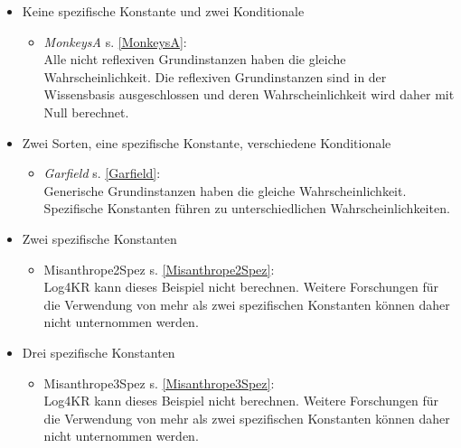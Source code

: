 \documentclass[a4paper, 11pt]{book}
\begin{document}
\begin{itemize}
\begin{itemize}
\end{itemize}

\item{Keine spezifische Konstante und zwei Konditionale}
\begin{itemize}
	\item \textsl{MonkeysA} \label{BMonkeysA} s. \ref{MonkeysA}:\\
	Alle nicht reflexiven Grundinstanzen haben die gleiche Wahrscheinlichkeit. Die reflexiven Grundinstanzen sind in der Wissensbasis ausgeschlossen und deren Wahrscheinlichkeit wird daher mit Null berechnet.

\end{itemize}
	
\item{Zwei Sorten, eine spezifische Konstante, verschiedene Konditionale}
\begin{itemize}
	\item \textsl{Garfield} \label{BGarfield} s. \ref{Garfield}:\\
	Generische Grundinstanzen haben die gleiche Wahrscheinlichkeit. Spezifische Konstanten führen zu unterschiedlichen Wahrscheinlichkeiten.
\end{itemize}

\item Zwei spezifische Konstanten 
\begin{itemize}
 \item{Misanthrope2Spez}	\label{BMisanthrope2Spez} s. \ref{Misanthrope2Spez}:\\
Log4KR kann dieses Beispiel nicht berechnen. Weitere Forschungen für die Verwendung von mehr als zwei spezifischen Konstanten können daher nicht unternommen werden.
\end{itemize}


	\item Drei spezifische Konstanten 
	\begin{itemize}
		\item{Misanthrope3Spez}	\label{BMisanthrope3Spez} s. \ref{Misanthrope3Spez}:\\
	Log4KR kann dieses Beispiel nicht berechnen. Weitere Forschungen für die Verwendung von mehr als zwei spezifischen Konstanten können daher nicht unternommen werden.
	\end{itemize}

\end{itemize}
\end{document}
